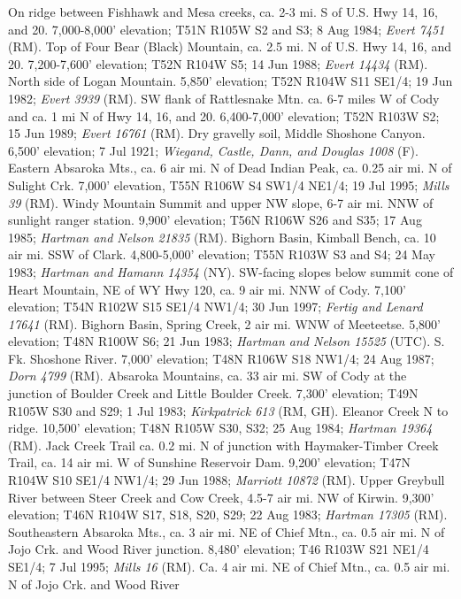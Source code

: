 On ridge between Fishhawk and Mesa creeks, ca. 2-3 mi. S of U.S. Hwy 14, 16,
and 20. 7,000-8,000’ elevation; T51N R105W S2 and S3; 8 Aug 1984;
\textit{Evert 7451} (RM).
Top of Four Bear (Black) Mountain, ca. 2.5 mi. N of U.S. Hwy 14, 16, and 20.
7,200-7,600’ elevation; T52N R104W S5; 14 Jun 1988; \textit{Evert 14434} (RM).
North side of Logan Mountain. 5,850’ elevation; T52N R104W S11 SE1/4;
19 Jun 1982; \textit{Evert 3939} (RM).
SW flank of Rattlesnake Mtn. ca. 6-7 miles W of Cody and ca. 1 mi N of Hwy 14,
16, and 20. 6,400-7,000' elevation; T52N R103W S2; 15 Jun 1989;
\textit{Evert 16761} (RM).
Dry gravelly soil, Middle Shoshone Canyon. 6,500’ elevation; 7 Jul 1921;
\textit{Wiegand, Castle, Dann, and Douglas 1008} (F).
Eastern Absaroka Mts., ca. 6 air mi. N of Dead Indian Peak, ca. 0.25 air mi. N
of Sulight Crk. 7,000’ elevation, T55N R106W S4 SW1/4 NE1/4; 19 Jul 1995;
\textit{Mills 39} (RM).
Windy Mountain Summit and upper NW slope, 6-7 air mi. NNW of sunlight
ranger station. 9,900’ elevation; T56N R106W S26 and S35; 17 Aug 1985;
\textit{Hartman and Nelson 21835} (RM).
Bighorn Basin, Kimball Bench, ca. 10 air mi. SSW of Clark. 4,800-5,000’
elevation; T55N R103W S3 and S4; 24 May 1983;
\textit{Hartman and Hamann 14354} (NY).
SW-facing slopes below summit cone of Heart Mountain, NE of WY Hwy 120, ca. 9
air mi. NNW of Cody. 7,100’ elevation; T54N R102W S15 SE1/4 NW1/4; 30 Jun 1997;
\textit{Fertig and Lenard 17641} (RM).
Bighorn Basin, Spring Creek, 2 air mi. WNW of Meeteetse. 5,800’ elevation;
T48N R100W S6; 21 Jun 1983; \textit{Hartman and Nelson 15525} (UTC).
S. Fk. Shoshone River. 7,000’ elevation; T48N R106W S18 NW1/4; 24 Aug 1987;
\textit{Dorn 4799} (RM).
Absaroka Mountains, ca. 33 air mi. SW of Cody at the junction of Boulder Creek
and Little Boulder Creek. 7,300’ elevation; T49N R105W S30 and S29; 1 Jul 1983;
\textit{Kirkpatrick 613} (RM, GH).
Eleanor Creek N to ridge. 10,500’ elevation; T48N R105W S30, S32; 25 Aug 1984;
\textit{Hartman 19364} (RM).
Jack Creek Trail ca. 0.2 mi. N of junction with Haymaker-Timber Creek Trail,
ca. 14 air mi. W of Sunshine Reservoir Dam.  9,200’ elevation; T47N R104W S10
SE1/4 NW1/4; 29 Jun 1988; \textit{Marriott 10872} (RM).
Upper Greybull River between Steer Creek and Cow Creek, 4.5-7 air mi. NW of
Kirwin. 9,300’ elevation; T46N R104W S17, S18, S20, S29; 22 Aug 1983;
\textit{Hartman 17305} (RM).
Southeastern Absaroka Mts., ca. 3 air mi. NE of Chief Mtn., ca. 0.5 air mi. N
of Jojo Crk. and Wood River junction. 8,480’ elevation; T46 R103W S21 NE1/4
SE1/4; 7 Jul 1995; \textit{Mills 16} (RM).
Ca. 4 air mi. NE of Chief Mtn., ca. 0.5 air mi. N of Jojo Crk. and Wood River
